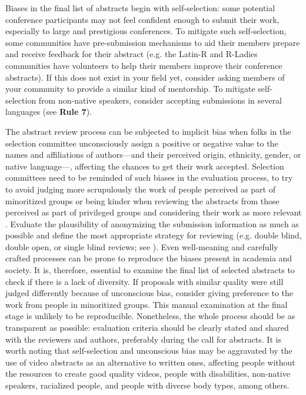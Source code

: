 \documentclass[10pt,letterpaper]{article}
\begin{document}
Biases in the final list of abstracts begin with self-selection: some potential conference participants may not feel confident enough to submit their work, especially to large and prestigious conferences.
To mitigate such self-selection, some communities have pre-submission mechanisms to aid their members prepare and receive feedback for their abstract (e.g. the Latin-R and R-Ladies communities have volunteers to help their members improve their conference abstracts).
If this does not exist in your field yet, consider asking members of your community to provide a similar kind of mentorship.
To mitigate self-selection from non-native speakers, consider accepting submissions in several languages (see \textbf{Rule 7}).


The abstract review process can be subjected to implicit bias \cite{ross_everyday_2020} when folks in the selection committee unconsciously assign a positive or negative value to the names and affiliations of authors—and their perceived origin, ethnicity, gender, or native language—, affecting the chances to get their work accepted. 
Selection committees need to be reminded of such biases in the evaluation process, to try to avoid judging more scrupulously the work of people perceived as part of minoritized groups or being kinder when reviewing the abstracts from those perceived as part of privileged groups and considering their work as more relevant \cite{swartzScienceValueDiversity2019, andersson_implicit_2019}.
Evaluate the plausibility of anonymizing the submission information as much as possible and
define the most appropriate strategy for reviewing (e.g. double blind, double open, or single blind reviews; see \cite{numfocus_discover_2021}).
Even well-meaning and carefully crafted processes can be prone to reproduce the biases present in academia and society. It is, therefore, essential to examine the final list of selected abstracts to check if there is a lack of diversity. If proposals with similar quality were still judged differently because of unconscious bias, consider giving preference to the work from people in minoritized groups.
This manual examination at the final stage is unlikely to be reproducible. Nonetheless, the whole process should be as transparent as possible: evaluation criteria should be clearly stated and shared with the reviewers and authors, preferably during the call for abstracts.
It is worth noting that self-selection and unconscious bias may be aggravated by the use of video abstracts as an alternative to written ones, affecting people without the resources to create good quality videos, people with disabilities, non-native speakers, racialized people, and people with diverse body types, among others. \cite{spitschanVideoGrantProposals2021}
\end{document}
